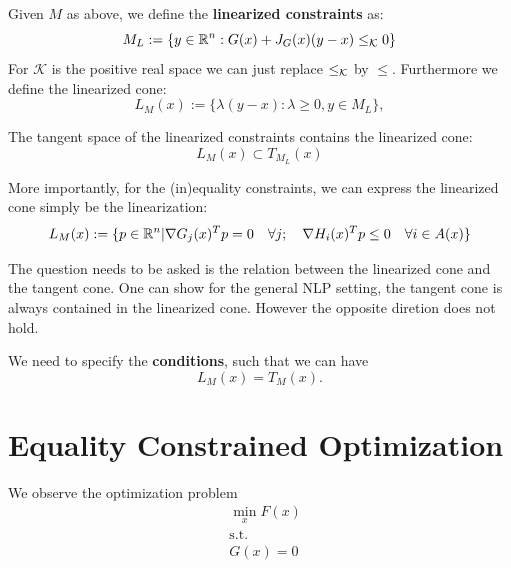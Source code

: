 \begin{definition}
	Given $M$ as above, we define the \textbf{linearized constraints} as: 
	\begin{equation}
		M_L:= \{ y \in \mathbb{R}^n : G(x) + J_G(x) (y - x) \le_\mathcal{K} 0 \}
	\end{equation}
	For $\mathcal{K}$ is the positive real space we can just replace $\le_\mathcal{K}$ by $\le$. Furthermore we define the linearized cone:
	\begin{equation}
		L_M(x):= \{ \lambda (y - x) : \lambda \ge 0, y \in M_L \},
	\end{equation}
\end{definition}
\begin{remark}
	The tangent space of the linearized constraints contains the linearized cone:
	\begin{equation*}
		L_M(x) \subset T_{M_L}(x)
	\end{equation*}
\end{remark}
More importantly, for the (in)equality constraints, we can express the linearized cone simply be the linearization:
\begin{equation}
	L_M(x):= \{ p \in \mathbb{R}^n | \nabla G_j(x)^Tp = 0 \quad \forall j ; \quad \nabla H_i(x)^T p \le 0 \quad \forall i \in A(x) \} 
\end{equation}


The question needs to be asked is the relation between the linearized cone and the tangent cone. One can show for the 
general NLP setting, the tangent cone is always contained in the linearized cone. However the opposite diretion does not hold. \par   
We need to specify the \textbf{conditions}, such that we can have
\[
L_M(x) = T_M(x)
.\]

\begin{definition}
\end{definition}

\begin{definition}[MFCQ]
\end{definition}


\section{Equality Constrained Optimization}
We observe the optimization problem
\begin{equation}
	\begin{aligned}
		& \min_x F(x)\\
		&\text{s.t.}\\
		& G(x) = 0
	\end{aligned}\tag{PEQ}\label{eq:PEQ}
\end{equation}


